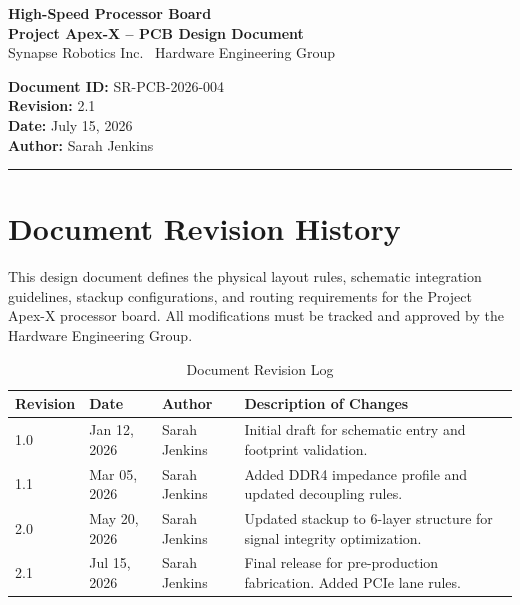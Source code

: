 \documentclass[11pt,a4paper]{article}
\begin{document}
\begin{center}
    \begin{minipage}{0.65\textwidth}
        {\Huge\bfseries\color{primary} High-Speed Processor Board}\\
        \vspace{0.2cm}
        {\large\bfseries\color{secondary} Project Apex-X -- PCB Design Document}\\
        \vspace{0.1cm}
        {\color{darktext}\small Synapse Robotics Inc. \textbar\ Hardware Engineering Group}
    \end{minipage}
    \hfill
    \begin{minipage}{0.3\textwidth}
        \begin{flushright}
            \color{darktext}\small
            \textbf{Document ID:} SR-PCB-2026-004\\
            \textbf{Revision:} 2.1\\
            \textbf{Date:} July 15, 2026\\
            \textbf{Author:} Sarah Jenkins
        \end{flushright}
    \end{minipage}
\end{center}
\vspace{0.2cm}
{\color{primary}\rule{\textwidth}{1.5pt}}
\vspace{0.4cm}

\section{Document Revision History}
This design document defines the physical layout rules, schematic integration guidelines, stackup configurations, and routing requirements for the Project Apex-X processor board. All modifications must be tracked and approved by the Hardware Engineering Group.

\vspace{0.2cm}
\begin{table}[h]
\centering
\fontsize{9}{11}\selectfont
\begin{tabularx}{\textwidth}{l l p{3cm} X}
\rowcolor{primary}
\color{white}\textbf{Revision} & \color{white}\textbf{Date} & \color{white}\textbf{Author} & \color{white}\textbf{Description of Changes} \\
\midrule
1.0 & Jan 12, 2026 & Sarah Jenkins & Initial draft for schematic entry and footprint validation. \\
\rowcolor{lightbg}
1.1 & Mar 05, 2026 & Sarah Jenkins & Added DDR4 impedance profile and updated decoupling rules. \\
2.0 & May 20, 2026 & Sarah Jenkins & Updated stackup to 6-layer structure for signal integrity optimization. \\
\rowcolor{lightbg}
2.1 & Jul 15, 2026 & Sarah Jenkins & Final release for pre-production fabrication. Added PCIe lane rules. \\
\bottomrule
\end{tabularx}
\caption{Document Revision Log}
\label{tab:revision}
\end{table}
\end{document}
